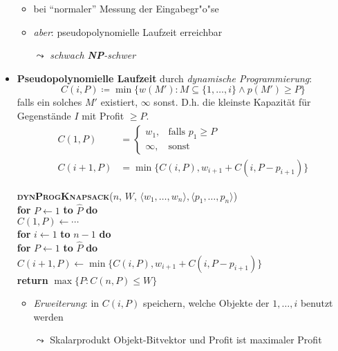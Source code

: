 \begin{itemize}
\begin{itemize}
    \item bei ``normaler'' Messung der Eingabegr"o"se
    \item \emph{aber}: pseudopolynomielle Laufzeit erreichbar
    \item[$ \leadsto $] \emph{schwach \textbf{NP}-schwer}
  \end{itemize}
  \item \textbf{Pseudopolynomielle Laufzeit} durch \emph{dynamische Programmierung}:
  \begin{equation*}
    C(i,P) \coloneqq \min\{ w(M') : M \subseteq \{ 1, \dots, i \} \wedge p(M') \geq P \}
  \end{equation*}
  falls ein solches $ M' $ existiert, $ \infty $ sonst. D.h. die kleinste Kapazität für Gegenstände $I$ mit Profit $\geq P$.
  \begin{align*}
    C(1,P) &= \begin{cases}
      w_1, &\text{falls } p_1 \geq P \\
      \infty, &\text{sonst}
    \end{cases} \\
    C(i+1, P) &= \min\{ C(i,P), w_{i+1}+C(i,P-p_{i+1}) \}
  \end{align*}
  \begin{pseudocode}
    \textsc{\textbf{dynProgKnapsack}}($ n $, $ W $, $ \langle w_1, \dots, w_n \rangle, \langle p_1, \dots, p_n \rangle $) \\
    \textbf{for} $ P \leftarrow 1 $ \textbf{to} $ \hat{P} $ \textbf{do} \\
    \phantom{\quad} $ C(1,P) \leftarrow \cdots $ \\
    \textbf{for} $ i \leftarrow 1 $ \textbf{to} $ n - 1 $ \textbf{do} \\
    \phantom{\quad} \textbf{for} $ P \leftarrow 1 $ \textbf{to} $ \hat{P} $ \textbf{do} \\
    \phantom{\quad} \phantom{\quad} $ C(i+1, P) \leftarrow \min\{ C(i,P), w_{i+1}+C(i,P-p_{i+1}) \} $ \\
    \textbf{return} $ \max\{ P : C(n,P) \leq W \} $
  \end{pseudocode}
  \begin{itemize}
    \item \emph{Erweiterung}: in $ C(i,P) $ speichern, welche Objekte der $ 1,\dots,i $ benutzt werden
    \item[$ \leadsto $] Skalarprodukt Objekt-Bitvektor und Profit ist maximaler Profit
  \end{itemize}
\end{itemize}

